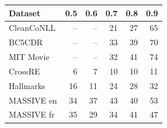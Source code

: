 \begin{tabular}{lrrrrr}
\toprule
Dataset & 0.5 & 0.6 & 0.7 & 0.8 & 0.9 \\
\midrule
CleanCoNLL & -- & -- & 21 & 27 & 65 \\
BC5CDR & -- & -- & 33 & 39 & 70 \\
MIT Movie & -- & -- & 32 & 41 & 74 \\
CrossRE & 6 & 7 & 10 & 10 & 11 \\
Hallmarks & 16 & 11 & 24 & 28 & 32 \\
MASSIVE en & 34 & 37 & 43 & 40 & 53 \\
MASSIVE fr & 35 & 29 & 34 & 41 & 47 \\
\bottomrule
\end{tabular}
